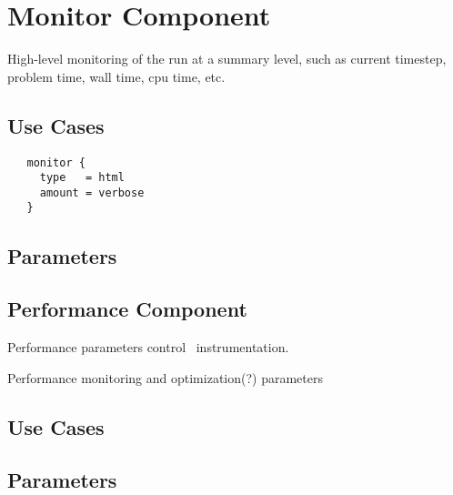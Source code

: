 \section{Monitor Component} \label{s:component-monitor}

High-level monitoring of the run at a summary level, such as current
timestep, problem time, wall time, cpu time, etc.

\subsection{Use Cases}
\begin{verbatim}
   monitor {
     type   = html
     amount = verbose
   }
\end{verbatim}
\subsection{Parameters}

\subsection{Performance Component} \label{ss:component-performance}
Performance parameters control \lcaperf\ instrumentation.

Performance monitoring and optimization(?) parameters

\subsection{Use Cases}
\subsection{Parameters}
